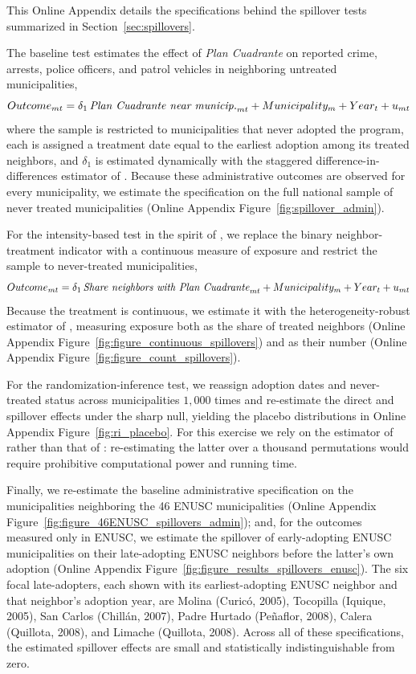 This Online Appendix details the specifications behind the spillover tests summarized in Section~\ref{sec:spillovers}.

The baseline test estimates the effect of \emph{Plan Cuadrante} on reported crime, arrests, police officers, and patrol vehicles in neighboring untreated municipalities,
\begin{equation}
Outcome_{mt}= \delta_{1}\,\mbox{\textit{Plan Cuadrante near municip.}}_{mt} + Municipality_{m} + Year_{t} + u_{mt}
\label{eq:main3}
\end{equation}
\noindent where the sample is restricted to municipalities that never adopted the program, each is assigned a treatment date equal to the earliest adoption among its treated neighbors, and $\delta_{1}$ is estimated dynamically with the staggered difference-in-differences estimator of \citet{Callaway}. Because these administrative outcomes are observed for every municipality, we estimate the specification on the full national sample of never treated municipalities (Online Appendix Figure~\ref{fig:spillover_admin}).

For the intensity-based test in the spirit of \citet{crepon2013}, we replace the binary neighbor-treatment indicator with a continuous measure of exposure and restrict the sample to never-treated municipalities,
\begin{equation}
Outcome_{mt}= \delta_{1}\,\mbox{\textit{Share neighbors with Plan Cuadrante}}_{mt} + Municipality_{m} + Year_{t} + u_{mt}
\label{eq:crepon}
\end{equation}
\noindent Because the treatment is continuous, we estimate it with the heterogeneity-robust estimator of \citet{Chaisemartin}, measuring exposure both as the share of treated neighbors (Online Appendix Figure~\ref{fig:figure_continuous_spillovers}) and as their number (Online Appendix Figure~\ref{fig:figure_count_spillovers}).

For the randomization-inference test, we reassign adoption dates and never-treated status across municipalities $1{,}000$ times and re-estimate the direct and spillover effects under the sharp null, yielding the placebo distributions in Online Appendix Figure~\ref{fig:ri_placebo}. For this exercise we rely on the estimator of \citet{Chaisemartin} rather than that of \citet{Callaway}: re-estimating the latter over a thousand permutations would require prohibitive computational power and running time.

Finally, we re-estimate the baseline administrative specification on the municipalities neighboring the 46 ENUSC municipalities (Online Appendix Figure~\ref{fig:figure_46ENUSC_spillovers_admin}); and, for the outcomes measured only in ENUSC, we estimate the spillover of early-adopting ENUSC municipalities on their late-adopting ENUSC neighbors before the latter's own adoption (Online Appendix Figure~\ref{fig:figure_results_spillovers_enusc}). The six focal late-adopters, each shown with its earliest-adopting ENUSC neighbor and that neighbor's adoption year, are Molina (Curic\'o, 2005), Tocopilla (Iquique, 2005), San Carlos (Chill\'an, 2007), Padre Hurtado (Pe\~naflor, 2008), Calera (Quillota, 2008), and Limache (Quillota, 2008). Across all of these specifications, the estimated spillover effects are small and statistically indistinguishable from zero.
